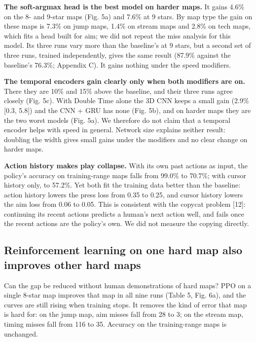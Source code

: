 \documentclass[10pt,a4paper]{article}
\begin{document}
\textbf{The soft-argmax head is the best model on harder maps.} It gains 4.6\% on the 8- and 9-star maps (Fig. 5a) and 7.6\% at 9 stars. By map type the gain on these maps is 7.3\% on jump maps, 1.4\% on stream maps and 2.8\% on tech maps, which fits a head built for aim; we did not repeat the miss analysis for this model. Its three runs vary more than the baseline's at 9 stars, but a second set of three runs, trained independently, gives the same result (87.9\% against the baseline's 76.3\%; Appendix C). It gains nothing under the speed modifiers.


\textbf{The temporal encoders gain clearly only when both modifiers are on.} There they are 10\% and 15\% above the baseline, and their three runs agree closely (Fig. 5c). With Double Time alone the 3D CNN keeps a small gain (2.9\% [0.3, 5.8]) and the CNN + GRU has none (Fig. 5b), and on harder maps they are the two worst models (Fig. 5a). We therefore do not claim that a temporal encoder helps with speed in general. Network size explains neither result: doubling the width gives small gains under the modifiers and no clear change on harder maps.


\textbf{Action history makes play collapse.} With its own past actions as input, the policy's accuracy on training-range maps falls from 99.0\% to 70.7\%; with cursor history only, to 57.2\%. Yet both fit the training data better than the baseline: action history lowers the press loss from 0.35 to 0.25, and cursor history lowers the aim loss from 0.06 to 0.05. This is consistent with the copycat problem [12]: continuing its recent actions predicts a human's next action well, and fails once the recent actions are the policy's own. We did not measure the copying directly.


\subsection{Reinforcement learning on one hard map also improves other hard maps}

Can the gap be reduced without human demonstrations of hard maps? PPO on a single 8-star map improves that map in all nine runs (Table 5, Fig. 6a), and the curves are still rising when training stops. It removes the kind of error that map is hard for: on the jump map, aim misses fall from 28 to 3; on the stream map, timing misses fall from 116 to 35. Accuracy on the training-range maps is unchanged.
\end{document}
